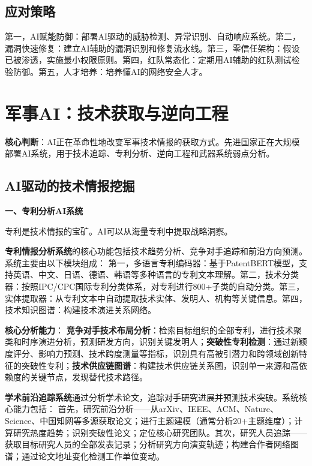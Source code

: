 \subsection{应对策略}
第一，AI赋能防御：部署AI驱动的威胁检测、异常识别、自动响应系统。第二，漏洞快速修复：建立AI辅助的漏洞识别和修复流水线。第三，零信任架构：假设已被渗透，实施最小权限原则。第四，红队常态化：定期用AI辅助的红队测试检验防御。第五，人才培养：培养懂AI的网络安全人才。


\section{军事AI：技术获取与逆向工程}

\textbf{核心判断}：AI正在革命性地改变军事技术情报的获取方式。先进国家正在大规模部署AI系统，用于技术追踪、专利分析、逆向工程和武器系统弱点分析。

\subsection{AI驱动的技术情报挖掘}

\textbf{一、专利分析AI系统}

专利是技术情报的宝矿。AI可以从海量专利中提取战略洞察。

\textbf{专利情报分析系统}的核心功能包括技术趋势分析、竞争对手追踪和前沿方向预测。系统主要由以下模块组成：
第一，多语言专利编码器：基于PatentBERT模型，支持英语、中文、日语、德语、韩语等多种语言的专利文本理解。第二，技术分类器：按照IPC/CPC国际专利分类体系，对专利进行800+子类的自动分类。第三，实体提取器：从专利文本中自动提取技术实体、发明人、机构等关键信息。第四，技术知识图谱：构建技术演进关系网络。

\textbf{核心分析能力}：
\textbf{竞争对手技术布局分析}：检索目标组织的全部专利，进行技术聚类和时序演进分析，预测研发方向，识别关键发明人；\textbf{突破性专利检测}：通过新颖度评分、影响力预测、技术跨度测量等指标，识别具有高被引潜力和跨领域创新特征的突破性专利；\textbf{技术供应链图谱}：构建技术供应链关系图，识别单一来源和高依赖度的关键节点，发现替代技术路径。

\textbf{学术前沿追踪系统}通过分析学术论文，追踪对手研究进展并预测技术突破。系统核心能力包括：
首先，研究前沿分析——从arXiv、IEEE、ACM、Nature、Science、中国知网等多源获取论文；进行主题建模（通常分析20+主题维度）；计算研究热度趋势；识别突破性论文；定位核心研究团队。其次，研究人员追踪——获取目标研究人员的全部发表记录；分析研究方向演变轨迹；构建合作者网络图谱；通过论文地址变化检测工作单位变动。

